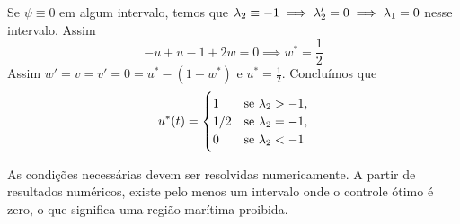Se $\psi \equiv 0$ em algum intervalo, temos que $\lambda_2 \equiv -1 \implies
\lambda_2' = 0 \implies \lambda_1 = 0$ nesse intervalo. Assim 
$$
-u + u - 1 + 2w = 0 \implies w^* = \frac{1}{2}
$$
Assim $w' = v = v' = 0 = u^* - (1 - w^*)$ e $u^* = \frac{1}{2}$. Concluímos
que 
\begin{equation}
    u^*(t) = \begin{cases}
        1 &\text{se }\lambda_2 > -1, \\
        1/2 &\text{se }\lambda_2 = -1, \\
        0 &\text{se }\lambda_2 < -1
    \end{cases}
\end{equation}

As condições necessárias devem ser resolvidas numericamente. A partir de
resultados numéricos, existe pelo menos um intervalo onde o controle ótimo é
zero, o que significa uma região marítima proibida. 